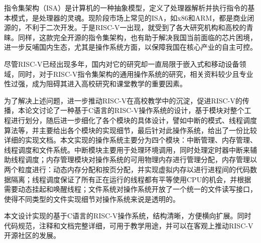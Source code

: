 \begin{cabstract}

指令集架构（ISA）是计算机的一种抽象模型，定义了处理器解析并执行指令的基本模式，是处理器的灵魂。现阶段市场上常见的ISA，如x86和ARM，都是商业闭源的，不利于二次开发。于是RISC-V一出现，就受到了各大研究机构和高校的青睐。同样，这款完全开源的指令集架构，也有助于解决我国当前面临的芯片困境，进一步反哺国内生态，尤其是操作系统方面，以保障我国在核心产业的自主可控。

尽管RISC-V已经出现多年，国内对它的研究却一直局限于嵌入式和移动设备领域，同时，对于RISC-V指令集架构的通用操作系统的研究，相关资料较少且专业性过强，成为阻碍其进入高校研究和课堂教学的重要因素。

为了解决上述问题，进一步推动RISC-V在高校教学中的沉淀，促进RISC-V的传播，本论文讨论了一种基于C语言的RISC-V操作系统的设计，基于模块对整个工程进行划分，随后进一步细化了各个模块的具体设计，譬如中断的模式、线程调度算法等，并主要给出各个模块的实现细节，最后针对此操作系统，给出了一份比较详细的实现文档。本文实现的操作系统主要分为四个模块：中断管理、内存管理、线程调度和文件系统。中断模块主要用于处理环境调用，同时处理定时器中断来辅助线程调度；内存管理模块对操作系统的可用物理内存进行管理分配，内存管理以两个粒度进行：动态内存分配和按页分配，并实现虚拟内存以进行进程间的代码数据隔离；线程调度保证了所有正在运行的线程都有平等使用CPU的机会，并根据需要动态挂起和唤醒线程；文件系统对操作系统开放了一个统一的文件读写接口，使得不同类型的文件实现细节对操作系统来说是透明的。

本文设计实现的基于C语言的RISC-V操作系统，结构清晰，方便横向扩展。同时代码规范，注释和文档完整详细，可用于教学用途，并可以在客观上推动RISC-V开源社区的发展。

\end{cabstract}

